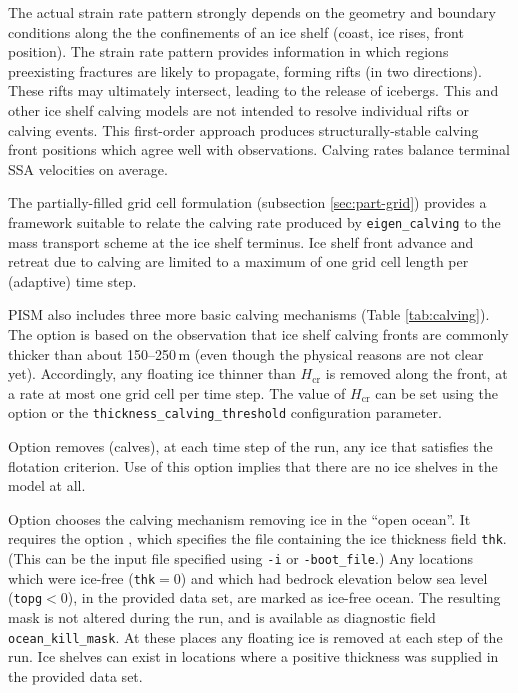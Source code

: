 The actual strain rate pattern strongly depends on the geometry and boundary conditions along the the confinements of an ice shelf (coast, ice rises, front position).  The strain rate pattern provides information in which regions preexisting fractures are likely to propagate, forming rifts (in two directions).  These rifts may ultimately intersect, leading to the release of icebergs. This and other ice shelf calving models are not intended to resolve individual rifts or calving events. This first-order approach produces structurally-stable calving front positions which agree well with observations.  Calving rates balance terminal SSA velocities on average.

The partially-filled grid cell formulation (subsection \ref{sec:part-grid}) provides a framework suitable to relate the calving rate produced by \texttt{eigen_calving} to the mass transport scheme at the ice shelf terminus.  Ice shelf front advance and retreat due to calving are limited to a maximum of one grid cell length per (adaptive) time step.

PISM also includes three more basic calving mechanisms (Table \ref{tab:calving}). The option  is based on the observation that ice shelf calving fronts are commonly thicker than about 150--250\,m (even though the physical reasons are not clear yet). Accordingly, any floating ice thinner than $H_{\textrm{cr}}$ is removed along the front, at a rate at most one grid cell per time step. The value of $H_{\mathrm{cr}}$ can be set using the  option or the \texttt{thickness_calving_threshold} configuration parameter.

Option  removes (calves), at each time step of the run, any ice that satisfies the flotation criterion.  Use of this option implies that there are no ice shelves in the model at all.

Option  chooses the calving mechanism removing ice in the ``open ocean''. It requires the option , which specifies the file containing the ice thickness field \texttt{thk}. (This can be the input file specified using \texttt{-i} or \texttt{-boot_file}.) Any locations which were ice-free (\texttt{thk}$=0$) and which had bedrock elevation below sea level (\texttt{topg}$<0$), in the provided data set, are marked as ice-free ocean.  The resulting mask is not altered during the run, and is available as diagnostic field \texttt{ocean_kill_mask}.  At these places any floating ice is removed at each step of the run.  Ice shelves can exist in locations where a positive thickness was supplied in the provided data set.

